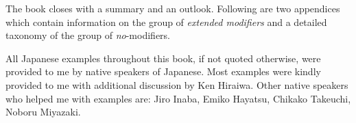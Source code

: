 The book closes with a summary and an outlook. Following are two appendices which contain information on the group of \textit{extended modifiers} and a detailed taxonomy of the group of \textit{no}-modifiers.

All Japanese examples throughout this book, if not quoted otherwise, were provided to me by native speakers of Japanese. Most examples were kindly provided to me with additional discussion by Ken Hiraiwa. Other native speakers who helped me with examples are: Jiro Inaba, Emiko Hayatsu, Chikako Takeuchi, Noboru Miyazaki.

